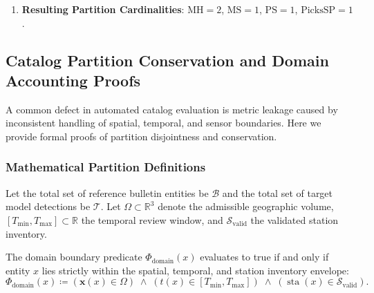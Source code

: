 \begin{enumerate}
\begin{align}
      X_{11}^* &= 1 \implies (b_1, \tau_1) \in
      \mathcal{MH}_{\mathrm{P}} \quad (\text{Matched P Pick}), \\
      X_{22}^* &= 1 \implies (b_2, \tau_2) \in
      \mathcal{MH}_{\mathrm{S}} \quad (\text{Matched S Pick}), \\
      b_3 &\implies b_3 \in \mathcal{MS}_{\mathrm{P}} \quad
      (\text{Missed Bulletin Pick}), \\
      \tau_3 &\implies \tau_3 \in \mathcal{PS}_{\mathrm{P}} \quad
      (\text{Proposed Pick Candidate}).
    \end{align}
  \item \textbf{Resulting Partition Cardinalities}:
    $\mathrm{MH} = \num{2}$, $\mathrm{MS} = \num{1}$, $\mathrm{PS} =
    \num{1}$, $\mathrm{PicksSP} = \num{1}$.
\end{enumerate}


\subsection*{Catalog Partition Conservation and Domain Accounting Proofs}
\label{subsec:supp_partition_conservation}

A common defect in automated catalog evaluation is metric leakage caused by
inconsistent handling of spatial, temporal, and sensor boundaries.
Here we provide
formal proofs of partition disjointness and conservation.

\subsubsection*{Mathematical Partition Definitions}
Let the total set of reference bulletin entities be $\mathcal{B}$
and the total set
of target model detections be $\mathcal{T}$. Let $\Omega \subset
\mathbb{R}^3$ denote the
admissible geographic volume, $[T_{\min}, T_{\max}] \subset
\mathbb{R}$ the temporal review window,
and $\mathcal{S}_{\mathrm{valid}}$ the validated station inventory.

\begin{definition}
  The domain boundary predicate $\Phi_{\mathrm{domain}}(x)$
  evaluates to true if and only if
  entity $x$ lies strictly within the spatial, temporal, and station
  inventory envelope:
  \begin{equation}
    \Phi_{\mathrm{domain}}(x) \coloneqq
    \left(\mathbf{x}(x) \in \Omega\right) \;\land\;
    \left(t(x) \in [T_{\min}, T_{\max}]\right) \;\land\;
    \left(\operatorname{sta}(x) \in \mathcal{S}_{\mathrm{valid}}\right).
    \label{eq:supp_domain_predicate}
  \end{equation}
\end{definition}

